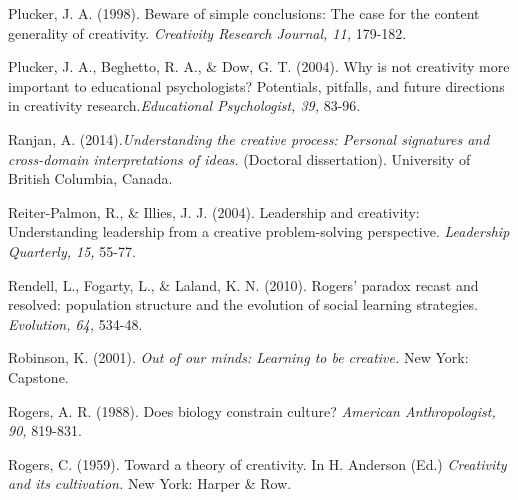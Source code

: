 \documentclass[a4paper,12pt,man,british]{apa6}
\begin{document}
\begin{description}

\item Plucker, J. A. (1998). Beware of simple conclusions: The case for the content generality of creativity. \emph{Creativity Research Journal, 11,} 179-182.

\item Plucker, J. A., Beghetto, R. A., \& Dow, G. T. (2004). Why is not creativity more important to educational psychologists? Potentials, pitfalls, and future directions in creativity research.\emph{Educational Psychologist, 39,} 83-96.


\item Ranjan, A. (2014).\emph{Understanding the creative process: Personal signatures and cross-domain interpretations of ideas.} (Doctoral dissertation). University of British Columbia, Canada.

\item Reiter-Palmon, R., \& Illies, J. J. (2004). Leadership and creativity: Understanding leadership from a creative problem-solving perspective. \emph{Leadership Quarterly, 15,} 55-77.

\item Rendell, L., Fogarty, L., \& Laland, K. N. (2010). Rogers' paradox recast and resolved: population structure and the evolution of social learning strategies. \emph{Evolution, 64,} 534-48.
 
 \item Robinson, K. (2001). \emph{Out of our minds: Learning to be creative.} New York: Capstone.

\item Rogers, A. R. (1988). Does biology constrain culture? \emph{American Anthropologist, 90,} 819-831.

\item Rogers, C. (1959). Toward a theory of creativity. In H. Anderson (Ed.) \emph{Creativity and its cultivation.} New York: Harper \& Row.



\end{description}
\end{document}
